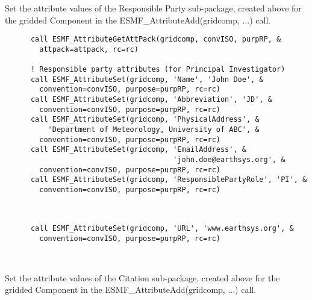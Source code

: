 
  \begin{sloppypar}
      Set the attribute values of the Responsible Party sub-package, created
      above for the gridded Component in the ESMF\_AttributeAdd(gridcomp, ...)
      call.
  \end{sloppypar} 

 \begin{verbatim}
      call ESMF_AttributeGetAttPack(gridcomp, convISO, purpRP, &
        attpack=attpack, rc=rc)

      ! Responsible party attributes (for Principal Investigator)
      call ESMF_AttributeSet(gridcomp, 'Name', 'John Doe', &
        convention=convISO, purpose=purpRP, rc=rc)
      call ESMF_AttributeSet(gridcomp, 'Abbreviation', 'JD', &
        convention=convISO, purpose=purpRP, rc=rc)
      call ESMF_AttributeSet(gridcomp, 'PhysicalAddress', &
          'Department of Meteorology, University of ABC', &
        convention=convISO, purpose=purpRP, rc=rc)
      call ESMF_AttributeSet(gridcomp, 'EmailAddress', &
                                       'john.doe@earthsys.org', &
        convention=convISO, purpose=purpRP, rc=rc)
      call ESMF_AttributeSet(gridcomp, 'ResponsiblePartyRole', 'PI', &
        convention=convISO, purpose=purpRP, rc=rc)
 
\end{verbatim}
 

 \begin{verbatim}

      call ESMF_AttributeSet(gridcomp, 'URL', 'www.earthsys.org', &
        convention=convISO, purpose=purpRP, rc=rc)

 
\end{verbatim}
 

  \begin{sloppypar}
      Set the attribute values of the Citation sub-package, created above
      for the gridded Component in the ESMF\_AttributeAdd(gridcomp, ...) call.
  \end{sloppypar} 

